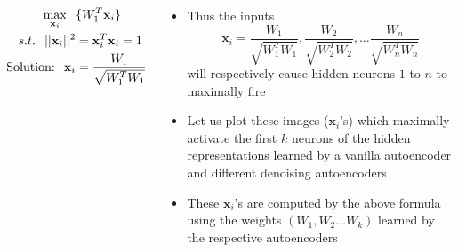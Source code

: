 \begin{frame}
  \begin{columns}
    \begin{overlayarea}{\textwidth}{\textheight}
        \begin{figure}
            
        \end{figure}

    \footnotesize{
    \begin{block}{}
    \begin{align*}
        \underset{\textbf{x}_i}{\max} \hspace{0.1in} & \{W_{1}^{T}\textbf{x}_{i}\}\\
         s.t.\hspace{0.1in}  ||\textbf{x}_i ||^{2} &= \textbf{x}_{i}^{T}\textbf{x}_{i} = 1\\
        \text{Solution:}\hspace{0.1in}  \textbf{x}_{i} &= \frac{W_{1}}{\sqrt{W_1^TW_1}}                               
    \end{align*}
    \end{block}}
    \end{overlayarea}

    \begin{overlayarea}{\textwidth}{\textheight}
        \begin{itemize}\justifying
            \item<1-> Thus the inputs \\
             \[ \textbf{x}_{i} =  \frac{W_{1}}{\sqrt{W_1^{T}W_{1}}}, \frac{W_{2}}{\sqrt{W_2^{T}W_{2}}}, \dots \frac{W_{n}}{\sqrt{W_n^{T}W_{n}}}  \]
            will respectively cause hidden neurons $1$ to $n$ to maximally fire    
        
            \item<2-> Let us plot these images ($\textbf{x}_{i}$'s) which maximally activate the first $k$ neurons  of the hidden representations learned by a vanilla autoencoder and different denoising autoencoders
   
            \item<3-> These $\textbf{x}_{i}$'s are computed by the above formula using the weights $(W_{1}, W_{2} \dots W_{k})$ learned by the respective autoencoders
        \end{itemize}
    \end{overlayarea}
  \end{columns}
\end{frame}

